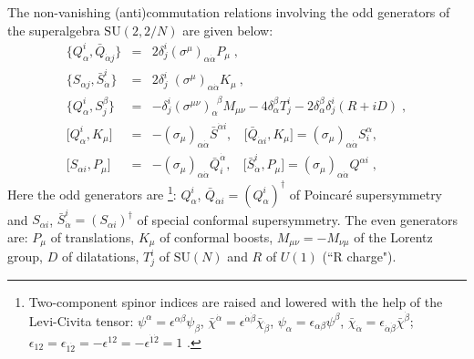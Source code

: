 \documentclass[a4paper,12pt]{article}
\begin{document}
The non-vanishing (anti)commutation relations involving the odd 
generators of the superalgebra $\mbox{SU}(2,2/N)$ are given below: 
\begin{eqnarray}
\big\{Q^i_\alpha, \bar Q_{\dot\alpha j}\big\} &=& 
2\delta^i_j(\sigma^\mu)_{\alpha\dot\alpha}P_\mu\;, \nonumber\\  
\big\{S_{\alpha j} , \bar S^{i}_{\dot\alpha}\big\} &=& 2 
\delta^i_j\;(\sigma^\mu)_{\alpha\dot\alpha}K_\mu~, \nonumber\\ 
\big\{Q^i_\alpha,S^{\beta }_j\big\} &=& - 
\delta^i_j(\sigma^{\mu\nu})_{\alpha }^{\;\;\beta}M_{\mu\nu} - 4 
\delta_{\alpha }^\beta T^i_j - 2\delta_{\alpha }^\beta \delta^i_j 
(R+iD)\;, \nonumber\\ \big[Q^i_\alpha,K_\mu\big] &=& 
-(\sigma_\mu)_{\alpha\dot\alpha}\bar S^{\dot\alpha i}, \ \ \ \ 
\big[\bar Q_{\dot\alpha i}, K_\mu\big] = 
(\sigma_\mu)_{\alpha\dot\alpha}S^\alpha_i, \nonumber\\ 
\big[S_{\alpha i},P_\mu\big] &=& 
-(\sigma_\mu)_{\alpha\dot\alpha}\bar Q^{\dot\alpha}_i, \ \ \ \ 
\big[\bar S^i_{\dot\alpha}, P_\mu\big] = 
(\sigma_\mu)_{\alpha\dot\alpha}Q^{\alpha i}\;, 
\label{2.21}\end{eqnarray} Here the odd generators are 
\footnote{Two-component spinor indices are raised and lowered with 
the help of the Levi-Civita tensor: $\psi^\alpha = 
\epsilon^{\alpha\beta}\psi_\beta$, $\bar\chi^{\dot\alpha} = 
\epsilon^{\dot\alpha\dot\beta}\bar\chi_{\dot\beta}$, $\psi_\alpha 
= \epsilon_{\alpha\beta}\psi^\beta$, $\bar\chi_{\dot\alpha} = 
\epsilon_{\dot\alpha\dot\beta}\bar\chi^{\dot\beta}$; 
$\epsilon_{12} = \epsilon_{\dot 1\dot 2} = -\epsilon^{12} = 
-\epsilon^{\dot 1\dot 2} = 1$%
.}: $Q^i_\alpha$,  $\bar Q_{\dot\alpha i} = (Q^i_\alpha)^\dagger$ 
of Poincar\'{e} supersymmetry and $S_{\alpha i}$, $\bar 
S_{\dot\alpha}^i = (S_{\alpha i})^\dagger$ of special conformal 
supersymmetry. The even generators are: $P_\mu$ of translations, 
$K_\mu$ of conformal boosts, $M_{\mu\nu}= -M_{\nu\mu}$ of the 
Lorentz group, $D$ of dilatations, $T^i_j$ of $\mbox{SU}(N)$ and 
$R$ of $U(1)$ (``R charge"). 
\end{document}
